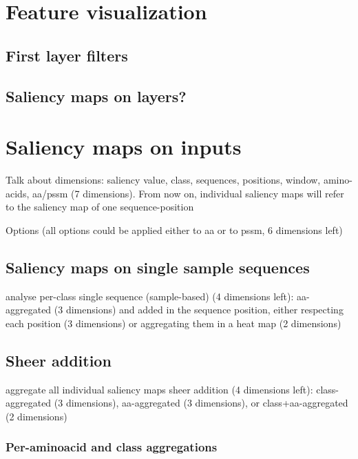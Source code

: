 \section{Feature visualization}

	\subsection{First layer filters}
	
	\subsection{Saliency maps on layers?}


\section{Saliency maps on inputs}
Talk about dimensions: saliency value, class, sequences, positions, window, amino-acids, aa/pssm (7 dimensions). From now on, individual saliency maps will refer to the saliency map of one sequence-position

Options (all options could be applied either to aa or to pssm, 6 dimensions left)
	
	\subsection{Saliency maps on single sample sequences}
	analyse per-class single sequence (sample-based) (4 dimensions left): aa-aggregated (3 dimensions) and added in the sequence position, either respecting each position (3 dimensions) or aggregating them in a heat map (2 dimensions)

	\subsection{Sheer addition}
	aggregate all individual saliency maps %
	sheer addition (4 dimensions left): class-aggregated (3 dimensions), aa-aggregated (3 dimensions), or class+aa-aggregated (2 dimensions)
		\subsubsection{Per-aminoacid and class aggregations}
		
